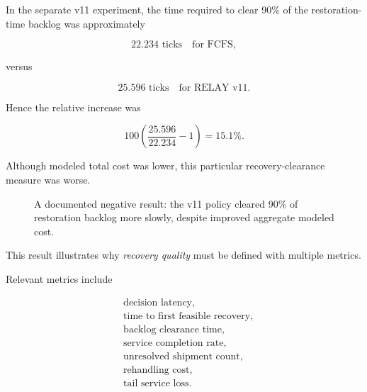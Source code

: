 \documentclass[10pt,a4paper]{article}
\theoremstyle{plain}
\theoremstyle{definition}
\theoremstyle{remark}
\begin{document}
In the separate v11 experiment,
the time required to clear
90\% of the restoration-time backlog
was approximately

\[
22.234\text{ ticks}
\quad\text{for FCFS},
\]

versus

\[
25.596\text{ ticks}
\quad\text{for RELAY v11}.
\]

Hence the relative increase was

\begin{equation}
100
\left(
\frac{25.596}{22.234}-1
\right)
=
\boxed{15.1\%}.
\end{equation}

Although modeled total cost was lower,
this particular recovery-clearance measure
was worse.

\begin{figure}[!htbp]
\centering


\caption{
A documented negative result:
the v11 policy cleared
90\% of restoration backlog more slowly,
despite improved aggregate modeled cost.
}
\label{fig:recovery-negative}
\end{figure}

This result illustrates why
\emph{recovery quality} must be
defined with multiple metrics.

Relevant metrics include

\[
\begin{aligned}
&\text{decision latency},\\
&\text{time to first feasible recovery},\\
&\text{backlog clearance time},\\
&\text{service completion rate},\\
&\text{unresolved shipment count},\\
&\text{rehandling cost},\\
&\text{tail service loss}.
\end{aligned}
\]
\end{document}
